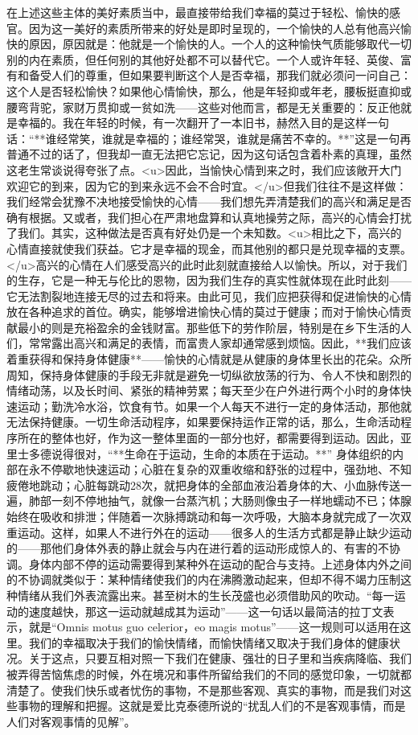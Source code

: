 \documentclass[12pt,oneside]{book}
\begin{document}
在上述这些主体的美好素质当中，最直接带给我们幸福的莫过于轻松、愉快的感官。因为这一美好的素质所带来的好处是即时呈现的，一个愉快的人总有他高兴愉快的原因，原因就是：他就是一个愉快的人。一个人的这种愉快气质能够取代一切别的内在素质，但任何别的其他好处都不可以替代它。一个人或许年轻、英俊、富有和备受人们的尊重，但如果要判断这个人是否幸福，那我们就必须问一问自己：这个人是否轻松愉快？如果他心情愉快，那么，他是年轻抑或年老，腰板挺直抑或腰弯背驼，家财万贯抑或一贫如洗——这些对他而言，都是无关重要的：反正他就是幸福的。我在年轻的时候，有一次翻开了一本旧书，赫然入目的是这样一句话：“**谁经常笑，谁就是幸福的；谁经常哭，谁就是痛苦不幸的。**”这是一句再普通不过的话了，但我却一直无法把它忘记，因为这句话包含着朴素的真理，虽然这老生常谈说得夸张了点。<u>因此，当愉快心情到来之时，我们应该敞开大门欢迎它的到来，因为它的到来永远不会不合时宜。</u>但我们往往不是这样做：我们经常会犹豫不决地接受愉快的心情——我们想先弄清楚我们的高兴和满足是否确有根据。又或者，我们担心在严肃地盘算和认真地操劳之际，高兴的心情会打扰了我们。其实，这种做法是否真有好处仍是一个未知数。<u>相比之下，高兴的心情直接就使我们获益。它才是幸福的现金，而其他别的都只是兑现幸福的支票。</u>高兴的心情在人们感受高兴的此时此刻就直接给人以愉快。所以，对于我们的生存，它是一种无与伦比的恩物，因为我们生存的真实性就体现在此时此刻——它无法割裂地连接无尽的过去和将来。由此可见，我们应把获得和促进愉快的心情放在各种追求的首位。确实，能够增进愉快心情的莫过于健康；而对于愉快心情贡献最小的则是充裕盈余的金钱财富。那些低下的劳作阶层，特别是在乡下生活的人们，常常露出高兴和满足的表情，而富贵人家却通常感到烦恼。因此，**我们应该着重获得和保持身体健康**——愉快的心情就是从健康的身体里长出的花朵。众所周知，保持身体健康的手段无非就是避免一切纵欲放荡的行为、令人不快和剧烈的情绪动荡，以及长时间、紧张的精神劳累；每天至少在户外进行两个小时的身体快速运动；勤洗冷水浴，饮食有节。如果一个人每天不进行一定的身体活动，那他就无法保持健康。一切生命活动程序，如果要保持运作正常的话，那么，生命活动程序所在的整体也好，作为这一整体里面的一部分也好，都需要得到运动。因此，亚里士多德说得很对，“**生命在于运动，生命的本质在于运动。**” 身体组织的内部在永不停歇地快速运动；心脏在复杂的双重收缩和舒张的过程中，强劲地、不知疲倦地跳动；心脏每跳动28次，就把身体的全部血液沿着身体的大、小血脉传送一遍，肺部一刻不停地抽气，就像一台蒸汽机；大肠则像虫子一样地蠕动不已；体腺始终在吸收和排泄；伴随着一次脉搏跳动和每一次呼吸，大脑本身就完成了一次双重运动。这样，如果人不进行外在的运动——很多人的生活方式都是静止缺少运动的——那他们身体外表的静止就会与内在进行着的运动形成惊人的、有害的不协调。身体内部不停的运动需要得到某种外在运动的配合与支持。上述身体内外之间的不协调就类似于：某种情绪使我们的内在沸腾激动起来，但却不得不竭力压制这种情绪从我们外表流露出来。甚至树木的生长茂盛也必须借助风的吹动。“每一运动的速度越快，那这一运动就越成其为运动”——这一句话以最简洁的拉丁文表示，就是“Omnis motus guo celerior，eo magis motus”——这一规则可以适用在这里。我们的幸福取决于我们的愉快情绪，而愉快情绪又取决于我们身体的健康状况。关于这点，只要互相对照一下我们在健康、强壮的日子里和当疾病降临、我们被弄得苦恼焦虑的时候，外在境况和事件所留给我们的不同的感觉印象，一切就都清楚了。使我们快乐或者忧伤的事物，不是那些客观、真实的事物，而是我们对这些事物的理解和把握。这就是爱比克泰德所说的“扰乱人们的不是客观事情，而是人们对客观事情的见解”。
\end{document}
